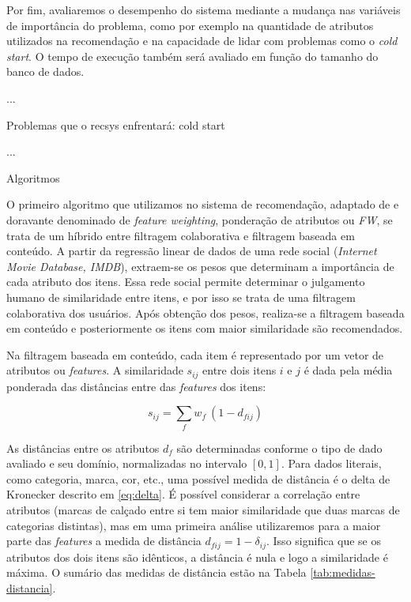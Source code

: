 Por fim, avaliaremos o desempenho do sistema mediante a mudança nas variáveis de importância do problema, como por exemplo na quantidade de atributos utilizados na recomendação e na capacidade de lidar com problemas como o \textit{cold start}. O tempo de execução também será avaliado em função do tamanho do banco de dados.

...

Problemas que o recsys enfrentará: cold start

...

Algoritmos

O primeiro algoritmo que utilizamos no sistema de recomendação, adaptado de  \cite{symeonidis2007feature} e doravante denominado de \textit{feature weighting}, ponderação de atributos ou \textit{FW}, se trata de um híbrido entre filtragem colaborativa e filtragem baseada em conteúdo. A partir da regressão linear de dados de uma rede social (\textit{Internet Movie Database, IMDB}), extraem-se os pesos que determinam a importância de cada atributo dos itens. Essa rede social permite determinar o julgamento humano de similaridade entre itens, e por isso se trata de uma filtragem colaborativa dos usuários. Após obtenção dos pesos, realiza-se a filtragem baseada em conteúdo e posteriormente os itens com maior similaridade são recomendados.

Na filtragem baseada em conteúdo, cada item é representado por um vetor de atributos ou \textit{features}. A similaridade $s_{ij}$ entre dois itens $i$ e $j$ é dada pela média ponderada das distâncias entre das \textit{features} dos itens:

\begin{equation} 
\label{eq:similaridade}
    s_{ij} = \sum_{f}{w_{f} ~ \left(1-d_{fij}\right)}
\end{equation}

As distâncias entre os atributos $d_f$ são determinadas conforme o tipo de dado avaliado e seu domínio, normalizadas no intervalo $\left[0,1\right]$. Para dados literais, como categoria, marca, cor, etc., uma possível medida de distância é o delta de Kronecker descrito em \ref{eq:delta}. É possível considerar a correlação entre atributos (marcas de calçado entre si tem maior similaridade que duas marcas de categorias distintas), mas em uma primeira análise utilizaremos para a maior parte das \textit{features} a medida de distância $d_{fij}=1-\delta_{ij}$. Isso significa que se os atributos dos dois itens são idênticos, a distância é nula e logo a similaridade é máxima. O sumário das medidas de distância estão na Tabela \ref{tab:medidas-distancia}.


